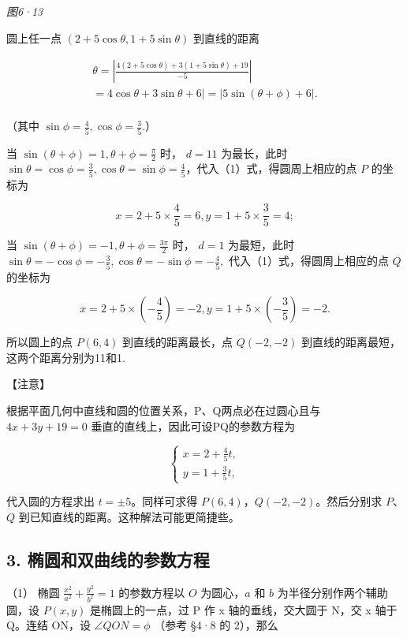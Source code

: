 \emph{图6·13}

圆上任一点 \((2+5\cos\theta,1+5\sin\theta)\) 到直线的距离

\[
\begin{array}{l} \theta = \left| \frac {4 (2 + 5 \cos \theta) + 3 (1 + 5 \sin \theta) + 19}{- 5} \right| \\ = 4 \cos \theta + 3 \sin \theta + 6 | = | 5 \sin (\theta + \phi) + 6 |. \\ \end{array}
\]

（其中 \(\sin\phi=\frac{4}{5},\cos\phi=\frac{3}{5}.\)）

当 \(\sin (\theta +\phi) = 1,\theta +\phi = \frac{\pi}{2}\) 时，
\(d = 11\)
为最长，此时\(\sin \theta = \cos \phi = \frac{3}{5},\cos \theta = \sin \phi = \frac{4}{5}\)，代入（1）式，得圆周上相应的点
\(P\) 的坐标为

\[
x = 2 + 5 \times \frac {4}{5} = 6, y = 1 + 5 \times \frac {3}{5} = 4;
\]

当 \(\sin (\theta +\phi) = -1,\theta +\phi = \frac{3\pi}{2}\) 时，
\(d = 1\) 为最短，此时
\(\sin \theta = -\cos \phi = -\frac{3}{5},\cos \theta = -\sin \phi = -\frac{4}{5},\)
代入（1）式，得圆周上相应的点 \(Q\) 的坐标为

\[
x = 2 + 5 \times \left(- \frac {4}{5}\right) = - 2, y = 1 + 5 \times \left(- \frac {3}{5}\right) = - 2.
\]

所以圆上的点 \(P(6,4)\) 到直线的距离最长，点 \(Q(-2,-2)\)
到直线的距离最短，这两个距离分别为11和1.

【注意】

根据平面几何中直线和圆的位置关系，P、Q两点必在过圆心且与 \(4x+3y+19=0\)
垂直的直线上，因此可设PQ的参数方程为

\[
\left\{ \begin{array}{l} x = 2 + \frac {4}{5} t, \\ y = 1 + \frac {3}{5} t, \end{array} \right.
\]

代入圆的方程求出 \(t = \pm 5\)。同样可求得
\(P(6, 4)\)，\(Q(-2, -2)\)。然后分别求 \(P\)、\(Q\)
到已知直线的距离。这种解法可能更简捷些。

\subsection{3.
椭圆和双曲线的参数方程}\label{ux692dux5706ux548cux53ccux66f2ux7ebfux7684ux53c2ux6570ux65b9ux7a0b}

（1） 椭圆 \(\frac{x^{2}}{a^{2}} + \frac{y^{2}}{b^{2}} = 1\)
的参数方程以 \(O\) 为圆心，\(a\) 和 \(b\) 为半径分别作两个辅助圆，设
\(P(x, y)\) 是椭圆上的一点，过 P 作 x 轴的垂线，交大圆于 N，交 x 轴于
Q。连结 ON，设 \(\angle QON = \phi\) （参考 §4·8 的 2），那么

